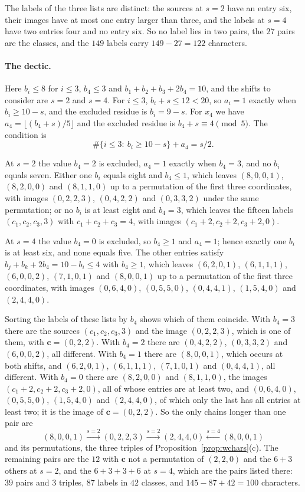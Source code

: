 \documentclass[11pt]{amsart}
\theoremstyle{definition}
\theoremstyle{remark}
\newcommand{\cc}{\mathbf{c}}
\begin{document}
The labels of the three lists are distinct: the sources at $s=2$ have an
entry six, their images have at most one entry larger than three, and the
labels at $s=4$ have two entries four and no entry six. So no label lies in
two pairs, the $27$ pairs are the classes, and the $149$ labels carry
$149-27=122$ characters.

\paragraph*{The dectic.}
Here $b_i\le8$ for $i\le3$, $b_4\le3$ and $b_1+b_2+b_3+2b_4=10$, and the
shifts to consider are $s=2$ and $s=4$. For $i\le3$, $b_i+s\le12<20$, so
$a_i=1$ exactly when $b_i\ge10-s$, and the excluded residue is
$b_i=9-s$. For $x_4$ we have $a_4=\lfloor(b_4+s)/5\rfloor$ and the excluded
residue is $b_4+s\equiv4\pmod5$. The condition is
\[
\#\{i\le3:\ b_i\ge10-s\}+a_4=s/2 .
\]

At $s=2$ the value $b_4=2$ is excluded, $a_4=1$ exactly when $b_4=3$, and
no $b_i$ equals seven. Either one $b_i$ equals eight and $b_4\le1$, which
leaves $(8,0,0,1)$, $(8,2,0,0)$ and $(8,1,1,0)$ up to a permutation of the
first three coordinates, with images $(0,2,2,3)$, $(0,4,2,2)$ and
$(0,3,3,2)$ under the same permutation; or no $b_i$ is at least eight and
$b_4=3$, which leaves the fifteen labels $(c_1,c_2,c_3,3)$ with
$c_1+c_2+c_3=4$, with images $(c_1+2,c_2+2,c_3+2,0)$.

At $s=4$ the value $b_4=0$ is excluded, so $b_4\ge1$ and $a_4=1$; hence
exactly one $b_i$ is at least six, and none equals five. The other entries
satisfy $b_j+b_k+2b_4=10-b_i\le4$ with $b_4\ge1$, which leaves
$(6,2,0,1)$, $(6,1,1,1)$, $(6,0,0,2)$, $(7,1,0,1)$ and $(8,0,0,1)$ up to
a permutation of the first three coordinates, with images $(0,6,4,0)$,
$(0,5,5,0)$, $(0,4,4,1)$, $(1,5,4,0)$ and $(2,4,4,0)$.

Sorting the labels of these lists by $b_4$ shows which of them coincide.
With $b_4=3$ there are the sources $(c_1,c_2,c_3,3)$ and the image
$(0,2,2,3)$, which is one of them, with $\cc=(0,2,2)$. With $b_4=2$ there
are $(0,4,2,2)$, $(0,3,3,2)$ and $(6,0,0,2)$, all different. With $b_4=1$
there are $(8,0,0,1)$, which occurs at both shifts, and $(6,2,0,1)$,
$(6,1,1,1)$, $(7,1,0,1)$ and $(0,4,4,1)$, all different. With $b_4=0$ there
are $(8,2,0,0)$ and $(8,1,1,0)$, the images $(c_1+2,c_2+2,c_3+2,0)$, all of
whose entries are at least two, and $(0,6,4,0)$, $(0,5,5,0)$, $(1,5,4,0)$
and $(2,4,4,0)$, of which only the last has all entries at least two; it is
the image of $\cc=(0,2,2)$. So the only chains longer than one pair are
\[
(8,0,0,1)\xrightarrow{s=2}(0,2,2,3)\xrightarrow{s=2}
(2,4,4,0)\xleftarrow{s=4}(8,0,0,1)
\]
and its permutations, the three triples of Proposition~\ref{prop:wchars}(c).
The remaining pairs are the $12$ with $\cc$ not a permutation of $(2,2,0)$
and the $6+3$ others at $s=2$, and the $6+3+3+6$ at $s=4$, which are the
pairs listed there: $39$ pairs and $3$ triples, $87$ labels in $42$ classes,
and $145-87+42=100$ characters.
\end{document}
